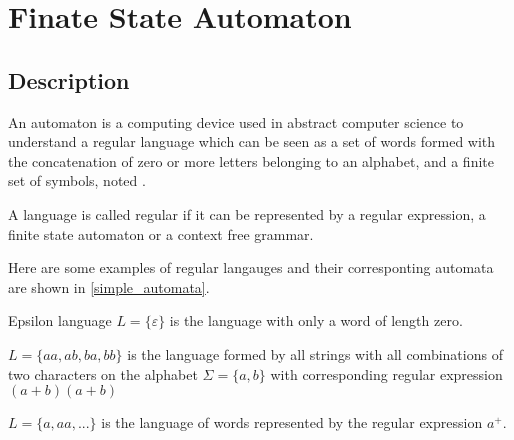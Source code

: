 \section{Finate State Automaton}

\subsection{Description}
An automaton \automaton{} is a computing device used in abstract computer science to understand a regular language \lang{} which can be seen as a set of words formed with the concatenation of zero or more letters  belonging to an alphabet, and a finite set of symbols, noted \alphabet{}.

\begin{theorem}
  A language is called regular if it can be represented by a regular expression, a finite state automaton or a context free grammar.
\end{theorem}

Here are some examples of regular langauges and their corresponting automata are shown in \cref{simple_automata}.
\begin{exmp}{Epsilon language}
  \label{exmp:lang_eps}
  $L = \{\varepsilon\}$ is the language with only a word of length zero.
\end{exmp}

\begin{exmp}
  \label{exmp:lang_ab_len2}
  $L = \{aa, ab, ba, bb\}$ is the language formed by all strings with all combinations of two characters on the alphabet $\Sigma = \{a, b\}$ with corresponding regular expression $(a+b)(a+b)$
\end{exmp}

\begin{exmp}
  \label{exmp:a_plus}
  $L = \{a, aa, ...\}$ is the language of words represented by the regular expression $a^+$.
\end{exmp}

